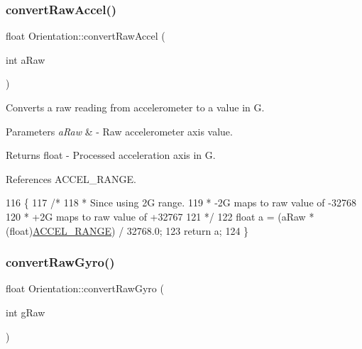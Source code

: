 \subsubsection{\texorpdfstring{convert\+Raw\+Accel()}{convertRawAccel()}}
{\footnotesize\ttfamily float Orientation\+::convert\+Raw\+Accel (\begin{DoxyParamCaption}\item[{int}]{a\+Raw }\end{DoxyParamCaption})\hspace{0.3cm}{\ttfamily [private]}}



Converts a raw reading from accelerometer to a value in G. 


\begin{DoxyParams}{Parameters}
{\em a\+Raw} & -\/ Raw accelerometer axis value. \\
\hline
\end{DoxyParams}
\begin{DoxyReturn}{Returns}
float -\/ Processed acceleration axis in G. 
\end{DoxyReturn}


References A\+C\+C\+E\+L\+\_\+\+R\+A\+N\+GE.


\begin{DoxyCode}
116 \{
117   \textcolor{comment}{/*}
118 \textcolor{comment}{   * Since using 2G range.}
119 \textcolor{comment}{   * -2G maps to raw value of -32768}
120 \textcolor{comment}{   * +2G maps to raw value of +32767}
121 \textcolor{comment}{   */}
122    \textcolor{keywordtype}{float} a = (aRaw * (float)\hyperlink{_orientation_8cpp_a16ec7011dea5773b504e875852f35fc1}{ACCEL\_RANGE}) / 32768.0;
123    \textcolor{keywordflow}{return} a;
124 \}
\end{DoxyCode}
\mbox{\label{class_orientation_a99bb5ed3c3226c5d636fa48f26f491dd}} 
\subsubsection{\texorpdfstring{convert\+Raw\+Gyro()}{convertRawGyro()}}
{\footnotesize\ttfamily float Orientation\+::convert\+Raw\+Gyro (\begin{DoxyParamCaption}\item[{int}]{g\+Raw }\end{DoxyParamCaption})\hspace{0.3cm}{\ttfamily [private]}}



